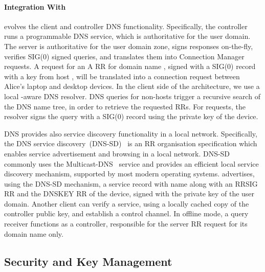 
\paragraph{\signpost Integration With \dnssec} 

\signpost evolves the \signpost client and controller DNS functionality.
Specifically, the controller runs a programmable DNS service, which is
authoritative for the user domain. The server is authoritative for the
user domain zone,  signs responses on-the-fly, verifies SIG(0) signed queries, and
translates them into Connection Manager requests. A request for an A RR for
domain name , signed with a SIG(0) record with a key from
host , will be translated into a connection request between
Alice's laptop and desktop devices.  
In the client side of the \signpost architecture, we use a local \signpost-aware
DNS resolver. DNS queries for non-\signpost hosts trigger a recursive search of
the DNS name tree, in order to retrieve the requested RRs.  For \signpost 
requests, the resolver signs the query with a SIG(0) record using the private
key of the device. 

DNS provides also service discovery functionality in a local network.
Specifically, the DNS service discovery~(DNS-SD)~ is an RR
organisation specification which enables service advertisement and browsing in
a local network. DNS-SD commonly uses the Multicast-DNS~
service and provides an efficient local service discovery mechanism, supported
by most modern operating systems. \signpost advertises, using the DNS-SD
mechanism, a \signpost service record with name  along
with an RRSIG RR and the DNSKEY RR of the device, signed with the private key
of the user domain. Another \signpost client can verify a \signpost service,
using a locally cached copy of the \signpost controller public key, and
establish a control channel.  In offline mode, a query receiver functions as a
\signpost controller, responsible for the server RR request for its domain name
only.

\subsection{Security and Key Management} \label{signpost-security}

